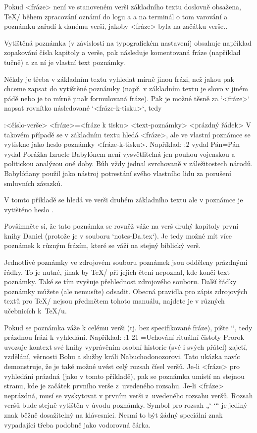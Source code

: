 Pokud <fráze> není ve stanoveném verši základního textu doslovně obsažena,
\TeX/ během zpracování oznámí do logu a a na terminál o tom varování a
poznámku zařadí k danému verši, jakoby <fráze> byla na začátku verše..

Vytištěná poznámka (v závislosti na typografickém nastavení) obsahuje
například zopakování čísla kapitoly a verše, pak následuje komentovaná fráze
(například tučně) a za ní je vlastní text poznámky.

Někdy je třeba v základním textu vyhledat mírně jinou frázi, než jakou pak
chceme zapsat do vytištěné poznámky (např. v základním textu je slovo v
jiném pádě nebo je to mírně jinak formulovaná fráze). Pak je možné těsně za
`{<fráze>}` napsat rovnítko následované `{<fráze-k-tisku>}`, tedy

\begtt
{}:<číslo-verše> {<fráze>}={<fráze k tisku>} <text-poznámky>
<prázdný řádek>
\endtt
V takovém případě se v základním textu hledá <fráze>, ale ve vlastní
poznámce se vytiskne jako heslo poznámky <fráze-k-tisku>. Například:
\begtt
{}:2 {vydal Pán}={Pán vydal} Porážka Izraele Babylónem není vysvětlitelná
   jen pouhou vojenskou a politickou analýzou oné doby. Bůh vždy jednal svrchovaně 
   v záležitostech národů. Babylóňany použil jako nástroj potrestání svého vlastního
   lidu za porušení smluvních závazků.

\endtt
V tomto příkladě se hledá ve verši druhém základního textu  
ale v poznámce je vytištěno heslo .

Povšimněte si, že tato poznámka se rovněž váže na verš druhý kapitoly první
knihy Daniel (protože je v souboru `notes-Da.tex`). Je tedy možné mít více
poznámek k různým frázím, které se váží na stejný biblický verš. 

Jednotlivé poznámky ve zdrojovém souboru poznámek jsou odděleny prázdnými
řádky. To je nutné, jinak by \TeX/ při jejich čtení nepoznal, kde končí text
poznámky. Také se tím zvyšuje přehlednost zdrojového souboru. Další řádky
poznámky můžete (ale nemusíte) odsadit. Obecná pravidla pro zápis
zdrojových textů pro \TeX/ nejsou předmětem tohoto manuálu, najdete je v
různých učebnicích k~\TeX/u.

Pokud se poznámka váže k celému verši (tj. bez specifikované fráze), pište
`{}`, tedy prázdnou frázi k vyhledání. Například:
\begtt
{}:1-21 {}={Uchování rituální čistoty}  Prorok uvozuje kontext své knihy vyprávěním
   osobní historie (své i svých přátel) zajetí, vzdělání, věrnosti Bohu a služby 
   králi Nabuchodonozorovi.
\endtt
Tato ukázka navíc demonstruje, že je také možné uvést celý rozsah čísel veršů.
Je-li <fráze> pro vyhledání prázdná (jako v tomto příkladě), pak se poznámka
umístí na stejnou stranu, kde je začátek prvního verše z~uvedeného rozsahu.
Je-li <fráze> neprázdná, musí se vyskytovat v prvním verši z~uvedeného
rozsahu veršů. Rozsah veršů bude stejně vytištěn v úvodu poznámky.
Symbol pro rozsah „`-`“ je jediný znak  běžně dosažitelný na
klávesnici. Nesmí to být žádný speciální znak vypadající třeba podobně jako
vodorovná čárka.

